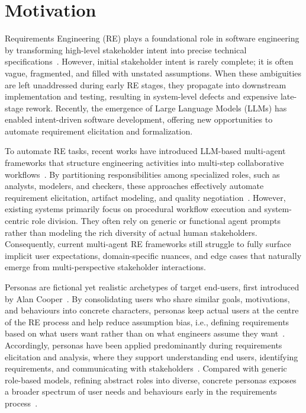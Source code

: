 \section{Motivation}
\label{sec:motivation}

Requirements Engineering (RE) plays a foundational role in software engineering by transforming high-level stakeholder intent into precise technical specifications~\cite{sommerville2015software}. However, initial stakeholder intent is rarely complete; it is often vague, fragmented, and filled with unstated assumptions. When these ambiguities are left unaddressed during early RE stages, they propagate into downstream implementation and testing, resulting in system-level defects and expensive late-stage rework. Recently, the emergence of Large Language Models (LLMs) has enabled intent-driven software development, offering new opportunities to automate requirement elicitation and formalization.

To automate RE tasks, recent works have introduced LLM-based multi-agent frameworks that structure engineering activities into multi-step collaborative workflows~\cite{mare2024, jin2025iredev}. By partitioning responsibilities among specialized roles, such as analysts, modelers, and checkers, these approaches effectively automate requirement elicitation, artifact modeling, and quality negotiation~\cite{mare2024, cheng2026quare}. However, existing systems primarily focus on procedural workflow execution and system-centric role division. They often rely on generic or functional agent prompts rather than modeling the rich diversity of actual human stakeholders. Consequently, current multi-agent RE frameworks still struggle to fully surface implicit user expectations, domain-specific nuances, and edge cases that naturally emerge from multi-perspective stakeholder interactions.

Personas are fictional yet realistic archetypes of target end-users, first introduced by Alan Cooper~\cite{cooper2004inmates}. By consolidating users who share similar goals, motivations, and behaviours into concrete characters, personas keep actual users at the centre of the RE process and help reduce assumption bias, i.e., defining requirements based on what users want rather than on what engineers assume they want~\cite{karolita2023personas}. Accordingly, personas have been applied predominantly during requirements elicitation and analysis, where they support understanding end users, identifying requirements, and communicating with stakeholders~\cite{karolita2023personas}. Compared with generic role-based models, refining abstract roles into diverse, concrete personas exposes a broader spectrum of user needs and behaviours early in the requirements process~\cite{sim2014empowering}.

